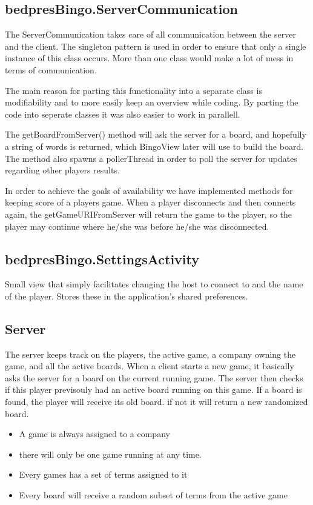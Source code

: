 \subsection{bedpresBingo.ServerCommunication}
The ServerCommunication takes care of all communication between the server and the client. The singleton pattern is used in order to ensure that only a single instance of this class occurs. More than one class would make a lot of mess in terms of communication. 

The main reason for parting this functionality into a separate class is modifiability and to more easily keep an overview while coding. By parting the code into seperate classes it was also easier to work in parallell. 

The getBoardFromServer() method will ask the server for a board, and hopefully a string of words is returned, which BingoView later will use to build the board. The method also spawns a pollerThread in order to poll the server for updates regarding other players results.

In order to achieve the goals of availability we have implemented methods for keeping score of a players game. When a player disconnects and then connects again, the getGameURIFromServer will return the game to the player, so the player may continue where he/she was before he/she was disconnected.

\subsection{bedpresBingo.SettingsActivity}
Small view that simply facilitates changing the host to connect to and the name of the player. Stores these in the application's
shared preferences.

\subsection{Server}
The server keeps track on the players, the active game, a company owning the game, and all the active boards. When a client starts a new game, it basically asks the server for a board on the current running game. The server then checks if this player previsouly had an active board running on this game. If a board is found, the player will receive its old board. if not it will return a new randomized board.

\begin{itemize}
	\item A game is always assigned to a company
	\item there will only be one game running at any time. 
	\item Every games has a set of terms assigned to it
	\item Every board will receive a random subset of terms from the active game
\end{itemize}

